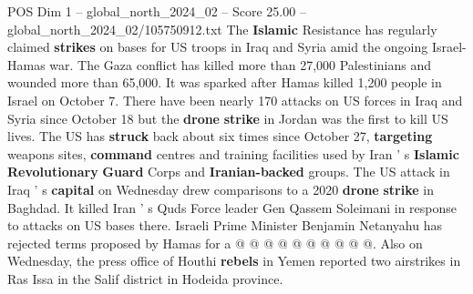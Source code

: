\begin{textsample}{POS Dim 1 – global\_north\_2024\_02 – Score 25.00 – global\_north\_2024\_02/105750912.txt}
The \textbf{Islamic} Resistance has regularly claimed \textbf{strikes} on bases for US troops in Iraq and Syria amid the ongoing Israel-Hamas war.
The Gaza conflict has killed more than 27,000 Palestinians and wounded more than 65,000.
It was sparked after Hamas killed 1,200 people in Israel on October 7.
There have been nearly 170 attacks on US forces in Iraq and Syria since October 18 but the \textbf{drone} \textbf{strike} in Jordan was the first to kill US lives.
The US has \textbf{struck} back about six times since October 27, \textbf{targeting} weapons sites, \textbf{command} centres and training facilities used by Iran ' s \textbf{Islamic} \textbf{Revolutionary} \textbf{Guard} Corps and \textbf{Iranian-backed} groups.
The US attack in Iraq ' s \textbf{capital} on Wednesday drew comparisons to a 2020 \textbf{drone} \textbf{strike} in Baghdad.
It killed Iran ' s Quds Force leader Gen Qassem Soleimani in response to attacks on US bases there.
Israeli Prime Minister Benjamin Netanyahu has rejected terms proposed by Hamas for a @ @ @ @ @ @ @ @ @ @.
Also on Wednesday, the press office of Houthi \textbf{rebels} in Yemen reported two airstrikes in Ras Issa in the Salif district in Hodeida province.

\end{textsample}

